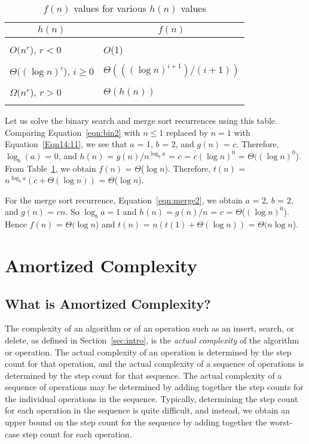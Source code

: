 \begin{table}
\begin{center}
\begin{tabular}{|l|l|}
\multicolumn{1}{|c|}{$h(n)$} & \multicolumn{1}{|c|}{$f(n)$}\\ \hline
 &  \\
 $O ( n^r$), $r < 0$ &  $O$(1)\\ 
 & \\
 $\Theta ( ( \log n)^i$), $i \geq 0$ &  $\Theta (( ( \log n)^{i+1} ) / (i+1))$\\
 & \\
 $\Omega ( n^r$), $r > 0$ &  $\Theta ( h(n))$\\
 & \\
\end{tabular}
\end{center}
\caption{$f(n)$ values for various $h(n)$ values
\label{fig14:14.8}}
\end{table}

 
Let us solve the binary search and merge sort recurrences using this table.
Comparing Equation~\ref{eqn:bin2} with $n \leq 1$ replaced by $n = 1$
with Equation~\ref{Eqn14:11}, we see that
$a$ = 1, $b$ = 2, and $g(n)$ = $c$.  Therefore,
$\log_b (a)$ = 0, and $h(n)$ = $g(n) / 
n^{\log_b a}$ = $c$ = $c ( \log n)^0$ =
$\Theta ( ( \log n)^0$).  From Table~\ref{fig14:14.8}, we obtain
$f(n)$ = $\Theta$($\log n$). 
Therefore,
$t(n)$ = $n^{\log_b a} (c+ \Theta ( \log n))$ =
$\Theta$($\log n$).
 
For the merge sort recurrence, Equation~\ref{eqn:merge2},
we obtain $a$ = 2, $b$ = 2, and $g(n)$ = $cn$.
So $\log_b a  =  1$ and $h(n) =  g(n) / n$ = $c$ = $\Theta$($( \log n)^0$).
Hence $f(n)$ = $\Theta ( \log n$) and $t(n)$ = $n(t(1) +  \Theta ( \log n))$ =
$\Theta ( n \log n$).
 

\section{Amortized Complexity}
\subsection{What is Amortized Complexity?}

The complexity of an algorithm or of an operation such
as an insert, search, or delete, as defined in
Section~\ref{sec:intro}, is the {\em  actual complexity} of the
algorithm or operation. The actual complexity of an operation
is determined by the step count
for that operation, and the actual complexity of a sequence of operations
is determined by the step count for that sequence. The actual
complexity of a sequence of operations may be determined
by adding together the step counts for the individual
operations in the sequence.
Typically, determining the step count for each operation in the sequence is
quite difficult, and instead, we obtain an upper bound on
the step count for the sequence
by adding together the worst-case step count for each operation.


